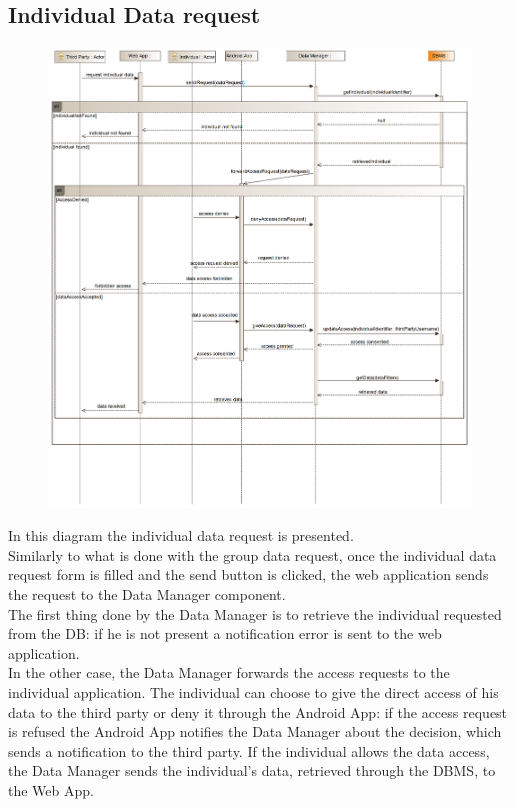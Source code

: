 \subsection{Individual Data request}
\begin{figure}[H]
\centering
\includegraphics[width=\linewidth]{resources/uml/sequence/RequestIndividualData.png}
\end{figure}
In this diagram the individual data request is presented.\\
Similarly to what is done with the group data request, once the individual data request form is filled and the send button is clicked, the web application sends the request to the Data Manager component.\\
The first thing done by the Data Manager is to retrieve the individual requested from the DB: if he is not present a notification error is sent to the web application.\\
In the other case, the Data Manager forwards the access requests to the individual application.
The individual can choose to give the direct access of his data to the third party or deny it through the Android App: if the access request is refused the Android App notifies the Data Manager about the decision, which sends a notification to the third party.
If the individual allows the data access, the Data Manager sends the individual's data, retrieved through the DBMS, to the Web App.


